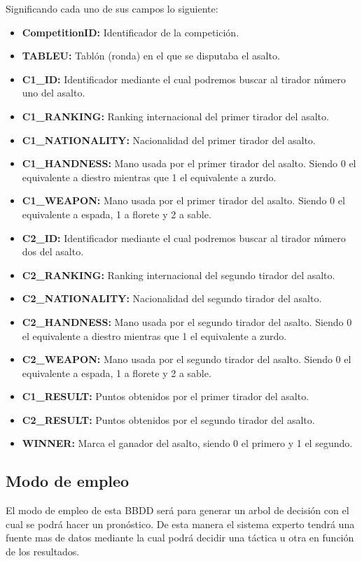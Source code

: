 Significando cada uno de sus campos lo siguiente:
\begin{itemize}
  \item \textbf{CompetitionID:} Identificador de la competición.
  \item \textbf{TABLEU:} Tablón (ronda) en el que se disputaba el asalto.
  \item \textbf{C1\_ID:} Identificador mediante el cual podremos buscar al tirador
    número uno del asalto.
  \item \textbf{C1\_RANKING:} Ranking internacional del primer tirador del asalto.
  \item \textbf{C1\_NATIONALITY:} Nacionalidad del primer tirador del asalto.
  \item \textbf{C1\_HANDNESS:} Mano usada por el primer tirador del asalto. Siendo
    0 el equivalente a diestro mientras que 1 el equivalente a zurdo.
  \item \textbf{C1\_WEAPON:} Mano usada por el primer tirador del asalto. Siendo 0
    el equivalente a espada, 1 a florete y 2 a sable.
  \item \textbf{C2\_ID:} Identificador mediante el cual podremos buscar al tirador
    número dos del asalto.
  \item \textbf{C2\_RANKING:} Ranking internacional del segundo tirador del asalto.
  \item \textbf{C2\_NATIONALITY:} Nacionalidad del segundo tirador del asalto.
  \item \textbf{C2\_HANDNESS:} Mano usada por el segundo tirador del asalto. Siendo
    0 el equivalente a diestro mientras que 1 el equivalente a zurdo.
  \item \textbf{C2\_WEAPON:} Mano usada por el segundo tirador del asalto. Siendo 0
    el equivalente a espada, 1 a florete y 2 a sable.
  \item \textbf{C1\_RESULT:} Puntos obtenidos por el primer tirador del asalto.
  \item \textbf{C2\_RESULT:} Puntos obtenidos por el segundo tirador del asalto.
  \item \textbf{WINNER:} Marca el ganador del asalto, siendo 0 el primero y 1 el segundo.
\end{itemize}

\newpage

\subsection{Modo de empleo}

El modo de empleo de esta BBDD será para generar un arbol de decisión con el
  cual se podrá hacer un pronóstico. De esta manera el sistema experto tendrá
  una fuente mas de datos mediante la cual podrá decidir una táctica u otra
  en función de los resultados.
